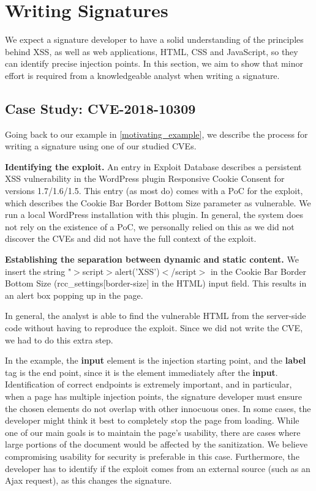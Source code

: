 \section{Writing Signatures} \label{signature_writing}

We expect a signature developer to have a solid understanding of the principles behind \ac{XSS}, as well as web applications, HTML, CSS and JavaScript, so they can identify precise injection points. In this section, we aim to show that minor effort is required from a knowledgeable analyst when writing a signature.


\subsection{Case Study: CVE-2018-10309} \label{case_study}
Going back to our example in \autoref{motivating_example}, we describe the process for writing a signature using one of our studied CVEs.

\textbf{Identifying the exploit.} An entry in Exploit Database
\cite{studyCVE} describes a persistent \ac{XSS} vulnerability in the
WordPress plugin Responsive Cookie Consent for versions
1.7/1.6/1.5. This entry (as most do) comes with a \ac{PoC} for the
exploit, which describes the Cookie Bar Border Bottom Size parameter
as vulnerable. We run a local WordPress installation with this plugin. In general, the system does not rely on the existence of a \ac{PoC}, we personally relied on this as we did not discover the CVEs and did not have the full context of the exploit.

\textbf{Establishing the separation between dynamic and static content.} We insert the string "$>$script$>$alert('XSS')$<$/script$>$ in the Cookie Bar Border Bottom Size (rcc\_settings[border-size] in the HTML) input field. This results in an alert box popping up in the page.

In general, the analyst is able to find the vulnerable HTML from the server-side code without having to reproduce the exploit. Since we did not write the CVE, we had to do this extra step.

In the example, the \textbf{input} element is the injection starting point, and the \textbf{label} tag is the end point, since it is the element immediately after the \textbf{input}. Identification of correct endpoints is extremely important, and in particular, when a page has multiple injection points, the signature developer must ensure the chosen elements do not overlap with other innocuous ones. In some cases, the developer might think it best to completely stop the page from loading. While one of our main goals is to maintain the page’s usability, there are cases where large portions of the document would be affected by the sanitization. We believe compromising usability for security is preferable in this case. Furthermore, the developer has to identify if the exploit comes from an external source (such as an Ajax request), as this changes the signature.

